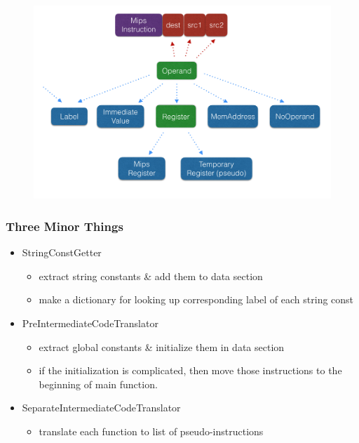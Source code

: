 \documentclass{beamer}
\begin{document}
\begin{frame}
	\begin{figure}
		\centering
		\includegraphics[width = \textwidth]{ir_2}
	\end{figure}
\end{frame}

\begin{frame}\frametitle{Three Minor Things}
	\begin{itemize}
		\item StringConstGetter
			\begin{itemize}
				\item extract string constants \& add them to data section
				\item make a dictionary for looking up corresponding label of each string const
			\end{itemize}
		\item PreIntermediateCodeTranslator
			\begin{itemize}
				\item extract global constants \& initialize them in data section
				\item if the initialization is complicated, then move those instructions to the beginning of main function.
			\end{itemize}
		\item SeparateIntermediateCodeTranslator
			\begin{itemize}
				\item translate each function to list of pseudo-instructions
			\end{itemize}
	\end{itemize}
\end{frame}
\end{document}
